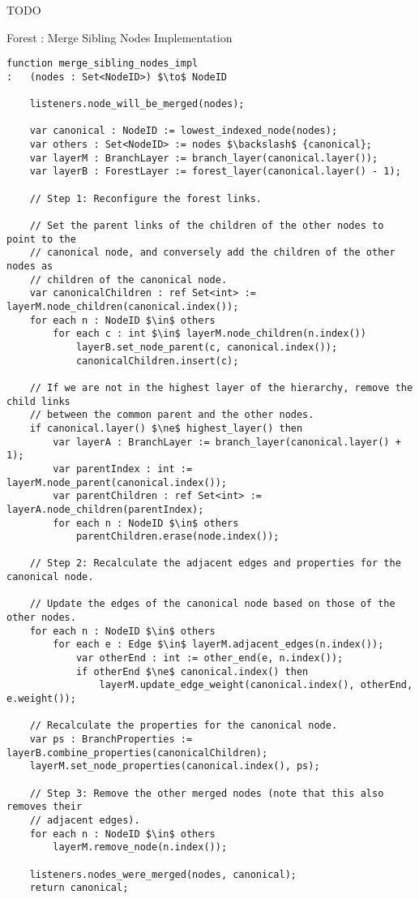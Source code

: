 TODO

\begin{stulisting}[p]
\caption{Forest : Merge Sibling Nodes Implementation}
\label{code:ipfs-forest-mergesiblingnodesimpl}
\begin{lstlisting}[style=Default]
function merge_sibling_nodes_impl
:	(nodes : Set<NodeID>) $\to$ NodeID

	listeners.node_will_be_merged(nodes);

	var canonical : NodeID := lowest_indexed_node(nodes);
	var others : Set<NodeID> := nodes $\backslash$ {canonical};
	var layerM : BranchLayer := branch_layer(canonical.layer());
	var layerB : ForestLayer := forest_layer(canonical.layer() - 1);

	// Step 1: Reconfigure the forest links.

	// Set the parent links of the children of the other nodes to point to the
	// canonical node, and conversely add the children of the other nodes as
	// children of the canonical node.
	var canonicalChildren : ref Set<int> := layerM.node_children(canonical.index());
	for each n : NodeID $\in$ others
		for each c : int $\in$ layerM.node_children(n.index())
			layerB.set_node_parent(c, canonical.index());
			canonicalChildren.insert(c);

	// If we are not in the highest layer of the hierarchy, remove the child links
	// between the common parent and the other nodes.
	if canonical.layer() $\ne$ highest_layer() then
		var layerA : BranchLayer := branch_layer(canonical.layer() + 1);
		var parentIndex : int := layerM.node_parent(canonical.index());
		var parentChildren : ref Set<int> := layerA.node_children(parentIndex);
		for each n : NodeID $\in$ others
			parentChildren.erase(node.index());

	// Step 2: Recalculate the adjacent edges and properties for the canonical node.

	// Update the edges of the canonical node based on those of the other nodes.
	for each n : NodeID $\in$ others
		for each e : Edge $\in$ layerM.adjacent_edges(n.index());
			var otherEnd : int := other_end(e, n.index());
			if otherEnd $\ne$ canonical.index() then
				layerM.update_edge_weight(canonical.index(), otherEnd, e.weight());

	// Recalculate the properties for the canonical node.
	var ps : BranchProperties := layerB.combine_properties(canonicalChildren);
	layerM.set_node_properties(canonical.index(), ps);

	// Step 3: Remove the other merged nodes (note that this also removes their
	// adjacent edges).
	for each n : NodeID $\in$ others
		layerM.remove_node(n.index());

	listeners.nodes_were_merged(nodes, canonical);
	return canonical;
\end{lstlisting}
\end{stulisting}

